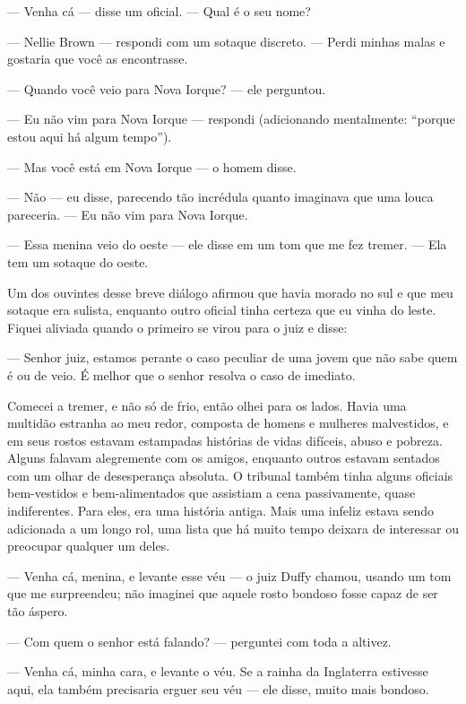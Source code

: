 --- Venha cá --- disse um oficial. --- Qual é o seu nome?

--- Nellie Brown --- respondi com um sotaque discreto. --- Perdi minhas
malas e gostaria que você as encontrasse.

--- Quando você veio para Nova Iorque? --- ele perguntou.

--- Eu não vim para Nova Iorque --- respondi (adicionando mentalmente:
``porque estou aqui há algum tempo'').

--- Mas você está em Nova Iorque --- o homem disse.

--- Não --- eu disse, parecendo tão incrédula quanto imaginava que uma
louca pareceria. --- Eu não vim para Nova Iorque.

--- Essa menina veio do oeste --- ele disse em um tom que me fez tremer.
--- Ela tem um sotaque do oeste.

Um dos ouvintes desse breve diálogo afirmou que havia morado no sul e
que meu sotaque era sulista, enquanto outro oficial tinha certeza que eu
vinha do leste. Fiquei aliviada quando o primeiro se virou para o juiz e
disse:

--- Senhor juiz, estamos perante o caso peculiar de uma jovem que não
sabe quem é ou de veio. É melhor que o senhor resolva o caso de
imediato.


Comecei a tremer, e não só de frio, então olhei para os lados. Havia uma
multidão estranha ao meu redor, composta de homens e mulheres malvestidos, 
e em seus rostos estavam estampadas histórias de vidas
difíceis, abuso e pobreza. Alguns falavam alegremente com os amigos,
enquanto outros estavam sentados com um olhar de desesperança absoluta.
O tribunal também tinha alguns oficiais bem-vestidos e bem-alimentados
que assistiam a cena passivamente, quase indiferentes. Para eles, era
uma história antiga. Mais uma infeliz estava sendo adicionada a um longo
rol, uma lista que há muito tempo deixara de interessar ou preocupar
qualquer um deles.

--- Venha cá, menina, e levante esse véu --- o juiz Duffy chamou, usando
um tom que me surpreendeu; não imaginei que aquele rosto bondoso fosse
capaz de ser tão áspero.

--- Com quem o senhor está falando? --- perguntei com toda a altivez.

--- Venha cá, minha cara, e levante o véu. Se a rainha da Inglaterra
estivesse aqui, ela também precisaria erguer seu véu --- ele disse,
muito mais bondoso.

